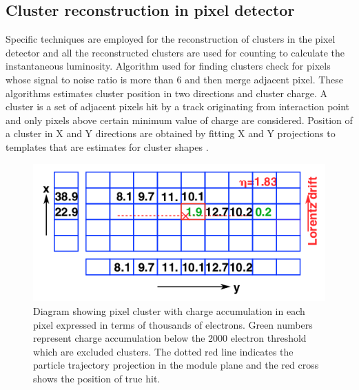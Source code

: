 \subsection{Cluster reconstruction in pixel detector}
Specific techniques are employed for the reconstruction of clusters in the pixel detector and all the reconstructed clusters are used for counting to calculate the instantaneous luminosity. Algorithm used for finding clusters check for pixels whose signal to noise ratio is more than 6 and then merge adjacent pixel. These algorithms estimates cluster position in two directions and cluster charge. A cluster is a set of adjacent pixels hit by a track originating from interaction point and only pixels above certain minimum value of charge are considered. Position of a cluster in X and Y directions are obtained by fitting X and Y projections to templates that are estimates for cluster shapes \cite{Chatrchyan:2014fea}. \\


\begin{figure}[H]
  \centering
  \includegraphics[width=0.6\columnwidth]{./pixel_reco.png}
  \caption{ \onehalfspacing Diagram showing pixel cluster with charge accumulation in each pixel expressed in terms of thousands of electrons. Green numbers represent charge accumulation below the 2000 electron threshold which are excluded clusters. The dotted red line indicates the particle trajectory projection in the module plane and the red cross shows the position of true hit.}
  \label{fig:CMS}
\end{figure}
